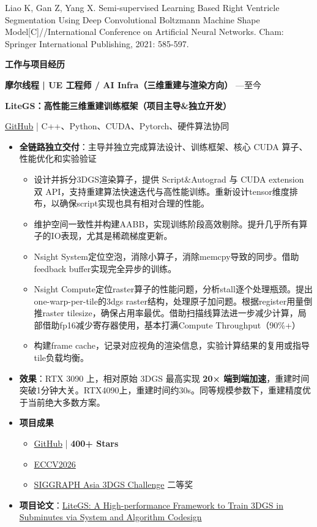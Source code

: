 \documentclass[10pt,a4paper]{article}
\newcommand{\ressection}[1]{
    \par 
    \vspace{5pt}
    {\color{accent} \fontsize{13}{13}\selectfont \bfseries #1}\par\vspace{-10pt}{\color{rulegray}\rule{\linewidth}{0.5pt}} 
    \par 
    \vspace{-5pt}}
\newcommand{\company}[2]{
    \par \vspace{10pt}
    {\fontsize{11}{11}\selectfont\bfseries #1}
    \hfill
    {\color{muted}\fontsize{10}{10}\selectfont #2}
    \par}
\newcommand{\project}[1]{
    \par
    \vspace{5pt}
    {\fontsize{10}{10}\selectfont \bfseries \hspace{10pt} #1}
    \par}
\newcommand{\meta}[1]{
    \par
    \vspace{-5pt}
    {\color{muted}\fontsize{10}{10}\selectfont \hspace{10pt} #1}
    \par}
\begin{document}
{\fontsize{10}{10}\selectfont Liao K, Gan Z, Yang X. Semi-supervised Learning Based Right Ventricle Segmentation Using Deep Convolutional Boltzmann Machine Shape Model[C]//International Conference on Artificial Neural Networks. Cham: Springer International Publishing, 2021: 585-597.\par}

\ressection{工作与项目经历}
\company{摩尔线程 | UE 工程师 / AI Infra（三维重建与渲染方向）}{2023.03—至今}
    \project{\textbf{LiteGS：高性能三维重建训练框架（项目主导\&独立开发）}}
    \meta{\href{https://github.com/MooreThreads/LiteGS}{GitHub} | C++、Python、CUDA、Pytorch、硬件算法协同}
    \begin{itemize}
    \item \textbf{全链路独立交付}：主导并独立完成算法设计、训练框架、核心 CUDA 算子、性能优化和实验验证
    \begin{itemize}
    \item 设计并拆分3DGS渲染算子，提供 Script\&Autograd 与 CUDA extension 双 API，支持重建算法快速迭代与高性能训练。重新设计tensor维度排布，以确保script实现也具有相对合理的性能。
    \item 维护空间一致性并构建AABB，实现训练阶段高效剔除。提升几乎所有算子的IO表现，尤其是稀疏梯度更新。
    \item Nsight System定位空泡，消除小算子，消除memcpy导致的同步。借助feedback buffer实现完全异步的训练。
    \item Nsight Compute定位raster算子的性能问题，分析stall逐个处理瓶颈。提出one-warp-per-tile的3dgs raster结构，处理原子加问题。根据register用量倒推raster tilesize，确保占用率最优。借助扫描线算法进一步减少计算，局部借助fp16减少寄存器使用，基本打满Compute Throughput（90\%+）
    \item 构建frame cache，记录对应视角的渲染信息，实验计算结果的复用或指导tile负载均衡。
    \end{itemize}
    \item \textbf{效果}：RTX 3090 上，相对原始 3DGS 最高实现 \textbf{20× 端到端加速}，重建时间突破1分钟大关。RTX4090上，重建时间约30s。同等规模参数下，重建精度优于当前绝大多数方案。
    \item \textbf{项目成果}
    \begin{itemize}
    \item \href{https://github.com/MooreThreads/LiteGS}{GitHub} | \textbf{400+ Stars }  
    \item \href{https://link.springer.com/chapter/10.1007/978-3-032-37422-6_33}{ECCV2026}
    \item \href{https://gaplab.cuhk.edu.cn/projects/gsRaceSIGA2025/index.html}{SIGGRAPH Asia 3DGS Challenge} 二等奖
    \end{itemize}
    \item \textbf{项目论文}：\href{https://arxiv.org/abs/2503.01199}{LiteGS: A High-performance Framework to Train 3DGS in Subminutes via System and Algorithm Codesign}
    \end{itemize}
\end{document}
